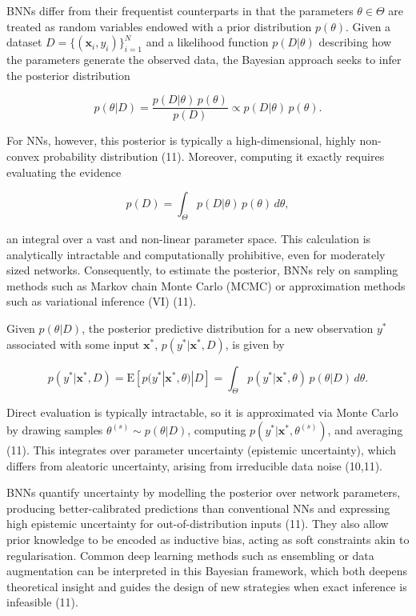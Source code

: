 \documentclass[
  a4paper,
]{scrreprt}
\begin{document}
BNNs differ from their frequentist counterparts in that the parameters
\(\theta \in \Theta\) are treated as random variables endowed with a
prior distribution \(p(\theta)\). Given a dataset
\(D = \{(\mathbf{x}_i, y_i)\}_{i=1}^N\) and a likelihood function
\(p(D | \theta)\) describing how the parameters generate the observed
data, the Bayesian approach seeks to infer the posterior distribution

\[
p(\theta | D) = \frac{p(D | \theta)\, p(\theta)}{p(D)} \propto p(D | \theta)\, p(\theta).
\]

For NNs, however, this posterior is typically a high-dimensional, highly
non-convex probability distribution (11). Moreover, computing it exactly
requires evaluating the evidence

\[
p(D) = \int_{\Theta} p(D | \theta)\, p(\theta) \, d\theta,
\]

an integral over a vast and non-linear parameter space. This calculation
is analytically intractable and computationally prohibitive, even for
moderately sized networks. Consequently, to estimate the posterior, BNNs
rely on sampling methods such as Markov chain Monte Carlo (MCMC) or
approximation methods such as variational inference (VI) (11).

Given \(p(\theta | D)\), the posterior predictive distribution for a new
observation \(y^{*}\) associated with some input \(\mathbf{x}^{*}\),
\(p(y^{*} | \mathbf{x}^{*}, D)\), is given by

\[
p(y^{*} | \mathbf{x}^{*}, D) = \text{E}\!\left[p(y^{*} | \mathbf{x}^{*}, \theta) | D\right] 
= \int_{\Theta} p(y^{*} | \mathbf{x}^{*}, \theta) \, p(\theta | D) \, d\theta.
\]

Direct evaluation is typically intractable, so it is approximated via
Monte Carlo by drawing samples \(\theta^{(s)} \sim p(\theta | D)\),
computing \(p(y^{*} | \mathbf{x}^{*}, \theta^{(s)})\), and averaging
(11). This integrates over parameter uncertainty (epistemic
uncertainty), which differs from aleatoric uncertainty, arising from
irreducible data noise (10,11).

BNNs quantify uncertainty by modelling the posterior over network
parameters, producing better-calibrated predictions than conventional
NNs and expressing high epistemic uncertainty for out-of-distribution
inputs (11). They also allow prior knowledge to be encoded as inductive
bias, acting as soft constraints akin to regularisation. Common deep
learning methods such as ensembling or data augmentation can be
interpreted in this Bayesian framework, which both deepens theoretical
insight and guides the design of new strategies when exact inference is
infeasible (11).
\end{document}
